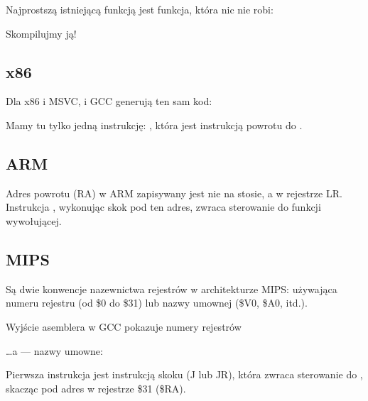 \label{empty_func}

Najprostszą istniejącą funkcją jest funkcja, która nic nie robi:



Skompilujmy ją!

\subsection{x86}

Dla x86 i MSVC, i GCC generują ten sam kod:



Mamy tu tylko jedną instrukcję: \RET, która jest instrukcją powrotu do .

\subsection{ARM}



Adres powrotu (\ac{RA}) w ARM zapisywany jest nie na stosie, a w rejestrze \ac{LR}.
Instrukcja , wykonując skok pod ten adres, zwraca sterowanie do funkcji wywołującej.

\subsection{MIPS}

Są dwie konwencje nazewnictwa rejestrów w architekturze MIPS:
używająca numeru rejestru (od \$0 do \$31) lub nazwy umownej (\$V0, \$A0, itd.).

Wyjście asemblera w GCC pokazuje numery rejestrów



\dots a \IDA --- nazwy umowne:




Pierwsza instrukcja jest instrukcją skoku (J lub JR),
która zwraca sterowanie do , skacząc pod adres w rejestrze \$31 (\$RA).

